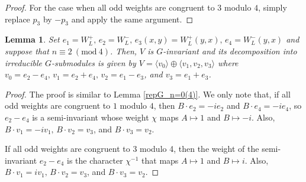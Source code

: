 \documentclass[a4paper,reqno]{amsart}
\newtheorem{lemma}[theorem]{Lemma}
\theoremstyle{definition}
\theoremstyle{remark} \newtheorem{remark}[theorem]{Remark}
\numberwithin{equation}{section}
\begin{document}
\begin{proof}
    For the case when all odd weights are congruent to \(3\) modulo \(4\), simply replace \(p_3\) by \(-p_3\) and apply the same argument.
\end{proof}

\begin{lemma}\label{repG:n=2(4)}
    Set \(e_1 = W_L^+,\, e_2 = W_L^-,\, e_3(x,y) = W_L^+(y,x),\, e_4 = W_L^-(y,x)\) and suppose that \(n \equiv 2 \ (\textrm{mod}\ 4)\). Then, \(V\) is \(G\)-invariant and its decomposition into irreducible \(G\)-submodules is given by \(V = \langle v_0 \rangle \oplus \langle v_1, v_2, v_3 \rangle\) where \(v_0 = e_2-e_4,\, v_1 = e_2 + e_4,\, v_2 = e_1 - e_3\), and \(v_3 = e_1 + e_3\).
\end{lemma}

\begin{proof}
    The proof is similar to Lemma \ref{repG_n=0(4)}. We only note that, if all odd weights are congruent to \(1\) modulo \(4\), then \(B \cdot e_2 = -i e_2\) and \(B \cdot e_4 = -ie_4\), so \(e_2 - e_4\) is a semi-invariant whose weight \(\chi\) maps \(A \mapsto 1\) and \(B \mapsto -i\). Also, \(B\cdot v_1 = -iv_1,\, B\cdot v_2 = v_3\), and \(B\cdot v_3 = v_2\).
    
    If all odd weights are congruent to \(3\) modulo 4, then the weight of the semi-invariant \(e_2-e_4\) is the character \(\chi^{-1}\) that maps \(A \mapsto 1\) and \(B \mapsto i\). Also, \(B\cdot v_1 = iv_1,\, B\cdot v_2 = v_3\), and \(B\cdot v_3 = v_2\).
\end{proof}
\end{document}

